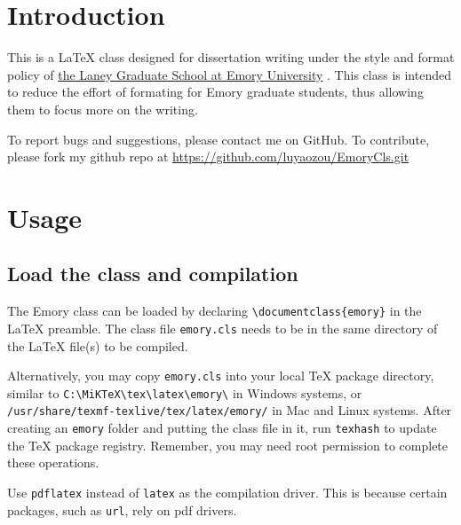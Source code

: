 \documentclass[final]{emory}
\begin{document}
\maketoc

\chapter{Introduction}

This is a \LaTeX{} class designed for dissertation writing under the style and
format policy of \href{http://www.graduateschool.emory.edu/uploads/academics/completion/Submit%20Thesis%20or%20Dissertation.doc}{the Laney Graduate School at Emory University} \autocite{emory-style}.
This class is
intended to reduce the effort of formating for Emory graduate students, thus 
allowing them to focus more on the writing. 

To report bugs and suggestions, please contact me on GitHub. To contribute, 
please fork my github repo at \url{https://github.com/luyaozou/EmoryCls.git}

\chapter{Usage}
\section{Load the class and compilation}
The Emory class can be loaded by declaring
\Verb|\documentclass{emory}| in the \LaTeX{} preamble. The class file
\Verb|emory.cls| needs to be in the same directory of the \LaTeX{} file(s) to be 
compiled. 

Alternatively, you may copy \Verb|emory.cls| into your local \TeX{} package 
directory, similar to \Verb|C:\MiKTeX\tex\latex\emory\| in Windows systems, or\\
\Verb|/usr/share/texmf-texlive/tex/latex/emory/| in Mac and Linux systems. After
creating an \Verb|emory| folder and putting the class file in it, run
\Verb|texhash| to update the \TeX{} package registry. Remember, you may need
root permission to complete these operations. 

Use \Verb|pdflatex| instead of \Verb|latex| as the compilation driver. This
is because certain packages, such as \Verb|url|, rely on pdf drivers.
\end{document}
